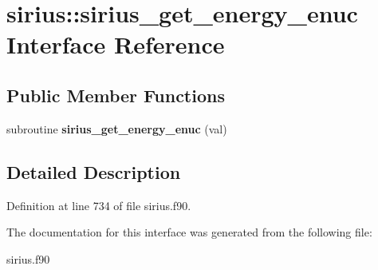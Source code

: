 \hypertarget{interfacesirius_1_1sirius__get__energy__enuc}{}\section{sirius\+:\+:sirius\+\_\+get\+\_\+energy\+\_\+enuc Interface Reference}
\label{interfacesirius_1_1sirius__get__energy__enuc}
\subsection*{Public Member Functions}
\begin{DoxyCompactItemize}
\item 
\hypertarget{interfacesirius_1_1sirius__get__energy__enuc_a0c44bc7590c9dbe7a33e26fee7bcb94d}{}subroutine {\bfseries sirius\+\_\+get\+\_\+energy\+\_\+enuc} (val)\label{interfacesirius_1_1sirius__get__energy__enuc_a0c44bc7590c9dbe7a33e26fee7bcb94d}

\end{DoxyCompactItemize}


\subsection{Detailed Description}


Definition at line 734 of file sirius.\+f90.



The documentation for this interface was generated from the following file\+:\begin{DoxyCompactItemize}
\item 
sirius.\+f90\end{DoxyCompactItemize}
